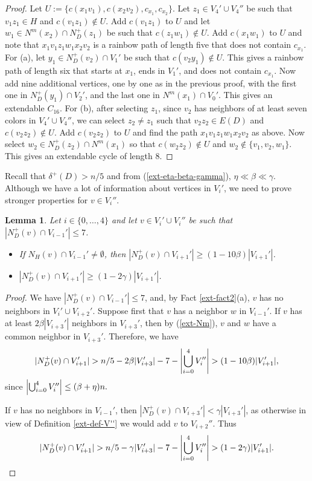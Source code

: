 \documentclass{article}
\newtheorem{lemma}[theorem]{Lemma}
\DeclarePairedDelimiter{\abs}{\lvert}{\rvert}
\begin{document}
\begin{proof}
Let $U:= \{c(x_1v_1), c(x_2v_2), c_{x_1}, c_{x_2}\}$. Let $z_1\in V_4'\cup V_4''$ be such that $v_1z_1\in H$ and $c(v_1z_1)\notin U$. Add $c(v_1z_1)$ to $U$ and let $w_1\in N^m(x_2)\cap N_D^+(z_1)$ be such that $c(z_1w_1)\notin U$. Add $c(x_1w_1)$ to $U$ and note that $x_1v_1z_1w_1x_2v_2$ is a rainbow path of length five that does not contain $c_{x_1}$. 
For (a), let $y_1\in N^+_D(v_2)\cap V_1'$ be such that $c(v_2y_1)\notin U$. This gives a rainbow path of length six that starts at $x_1$, ends in $V_1'$, and does not contain $c_{x_1}$. Now add nine additional vertices, one by one as in the previous proof, with the first one in $N^+_D(y_1)\cap V_2'$, and the last one in $N^m(x_1)\cap V_0'$. This gives an extendable $C_{16}.$
For (b), after selecting $z_1$, since $v_2$ has neighbors of at least seven  colors in  $V_{4}'\cup V_4''$, we can select $z_2\neq z_1$ such that $v_2z_2\in E(D)$ and $c(v_2z_2)\notin U$. Add $c(v_2z_2)$ to $U$ and find the path $x_1v_1z_1w_1x_2v_2$ as above.
 Now select $w_2\in N^+_D(z_2)\cap N^m(x_1)$ so that $c(w_2z_2)\notin U$ and $w_2\notin \{v_1, v_2, w_1\}$. This gives an extendable cycle of length $8$.
\end{proof}
Recall that $\delta^+(D)>n/5$ and from (\ref{ext-eta-beta-gamma}),  $\eta \ll \beta \ll \gamma$. Although we have a lot of information about vertices in $V_i'$, we need to prove stronger properties for $v\in V_i''$.
\begin{lemma}\label{ext-lem-beta-gamma}
 Let $i\in \{0, \dots, 4\}$ and let $v\in V_i'\cup V_i''$ be such that $|N^+_D(v)\cap V_{i-1}'|\leq 7$.
 \begin{itemize}
     \item[(a)]  If $N_H(v) \cap V_{i-1}'\neq \emptyset$,
     then $|N^+_D(v) \cap V_{i+1}'|\geq (1-{10}\beta)|V_{i+1}'|$.
     \item[(b)] $|N^+_D(v)
     \cap V_{i+1}'|\geq (1-2\gamma)|V_{i+1}'|$. 
 \end{itemize}
 \end{lemma}
 \begin{proof}
  We have $|N^+_D(v)\cap V_{i-1}'|\leq 7$, and, by Fact \ref{ext-fact2}(a), $v$ has no neighbors in $V_i'\cup V_{i+2}'$. Suppose first that $v$ has a neighbor $w$ in $V_{i-1}'.$ If $v$ has at least $2\beta |V_{i+3}'|$ neighbors in $V_{i+3}'$, then by (\ref{ext-Nm}), $v$ and $w$ have a common neighbor in  $V_{i+3}'$. Therefore, we have 
  $$|N^+_D(v)\cap V_{i+1}'| > n/5- 2\beta |V_{i+3}'|-7 - \abs*{\bigcup_{i=0}^4 V_i''} > (1- 10\beta)|V_{i+1}'|,$$
  since $\abs*{\bigcup_{i=0}^4 V_i''}\leq (\beta +\eta) n.$
 
 If $v$ has no neighbors in $V_{i-1}'$, then $|N^+_D(v)\cap V_{i+3}'|<\gamma |V_{i+3}'|$, as otherwise in view of Definition \ref{ext-def-V''} we would add $v$ to $V_{i+2}''$. Thus $$|N^+_D(v)\cap V_{i+1}'|>n/5- \gamma |V_{i+3}'|-7- \abs*{\bigcup_{i=0}^4 V_i''} > (1- 2\gamma)|V_{i+1}'|.$$ 
 \end{proof}
\end{document}
